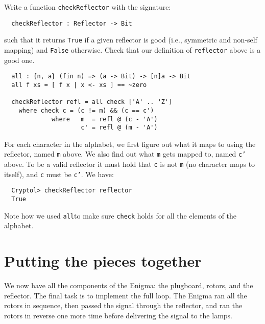 \begin{Exercise}\label{ex:enigma:6}
Write a function {\tt checkReflector} with the signature:
\begin{Verbatim}
  checkReflector : Reflector -> Bit
\end{Verbatim}
such that it returns {\tt True} if a given reflector is good (i.e.,
symmetric and non-self mapping) and {\tt False} otherwise. Check that
our definition of {\tt reflector} above is a good one. 
\end{Exercise}
\begin{Answer}
\begin{Verbatim}
  all : {n, a} (fin n) => (a -> Bit) -> [n]a -> Bit
  all f xs = [ f x | x <- xs ] == ~zero

  checkReflector refl = all check ['A' .. 'Z']
    where check c = (c != m) && (c == c')
             where   m  = refl @ (c - 'A')
                     c' = refl @ (m - 'A')
\end{Verbatim}
For each character in the alphabet, we first figure out what it maps
to using the reflector, named {\tt m} above. We also find out what
{\tt m} gets mapped to, named {\tt c'} above. To be a valid reflector
it must hold that {\tt c} is not {\tt m} (no character maps to
itself), and {\tt c} must be {\tt c'}. We have:
\begin{Verbatim}
  Cryptol> checkReflector reflector
  True
\end{Verbatim}
Note how we used {\tt all}\indAll to make sure {\tt check} holds for
all the elements of the alphabet.
\end{Answer}

\section{Putting the pieces together}
\label{sec:enigma:puttingittogether}

We now have all the components of the Enigma: the plugboard, rotors,
and the reflector.  The final task is to implement the full loop. The
Enigma ran all the rotors in sequence, then passed the signal through
the reflector, and ran the rotors in reverse one more time before
delivering the signal to the lamps.

